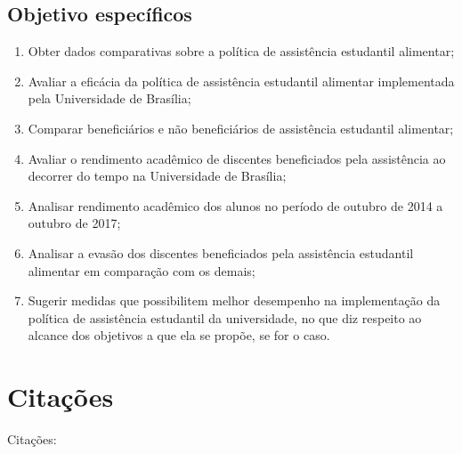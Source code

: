 \subsection{Objetivo específicos}
\begin{enumerate}
	\item Obter dados comparativas sobre a política de assistência estudantil alimentar;
	\item Avaliar a eficácia da política de assistência estudantil alimentar implementada pela Universidade de Brasília;
	\item Comparar beneficiários e não beneficiários de assistência estudantil alimentar;
	\item Avaliar o rendimento acadêmico de discentes beneficiados pela assistência ao decorrer do tempo na Universidade de Brasília; 
	\item Analisar rendimento acadêmico dos alunos no período de outubro de 2014 a outubro de 2017;
	\item Analisar a evasão dos discentes beneficiados pela assistência estudantil alimentar em comparação com os demais;
	\item Sugerir medidas que possibilitem melhor desempenho na implementação da política de assistência estudantil da universidade, no que diz respeito ao alcance dos objetivos a que ela se propõe, se for o caso.
\end{enumerate}%
\section{Citações}%
   Citações: 
   \cite{Vasconcelos2010PROGRAMABRASIL}

